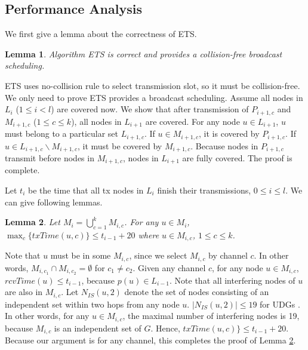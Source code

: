 \documentclass[10pt, conference]{IEEEtran}
\newtheorem{lemma}{Lemma}
\begin{document}
\subsection{Performance Analysis}
We first give a lemma about the correctness of ETS.
\begin{lemma} \label{correctness}
Algorithm ETS is correct and provides a collision-free broadcast scheduling.
\end{lemma}
\begin{IEEEproof}
ETS uses no-collision rule to select transmission slot, so it
must be collision-free. We only need to prove ETS provides a
broadcast scheduling. Assume all nodes in $L_{i}$ ($1 \leq i
<l$) are covered now. We show that after transmission of
$P_{i+1,c}$ and $M_{i+1,c}$ ($1 \leq c \leq k$), all nodes in
$L_{i+1}$ are covered. For any node $u \in L_{i+1}$, $u$ must
belong to a particular set $L_{i+1,c}$. If $u \in M_{i+1,c}$,
it is covered by $P_{i+1,c}$. If $u \in L_{i+1,c}\backslash
M_{i+1,c}$, it must be covered by $M_{i+1,c}$. Because nodes in
$P_{i+1,c}$ transmit before nodes in $M_{i+1,c}$, nodes in
$L_{i+1}$ are fully covered. The proof is complete.

\end{IEEEproof}

Let $t_i$ be the time that all tx nodes in $L_i$ finish their
transmissions, $0 \leq i \leq l$. We can give following lemmas.
\begin{lemma} \label{dominators}
Let $M_i = \bigcup_{c=1}^{k} M_{i,c}$. For any $u \in M_{i}$, $\max_c \{txTime(u,c)\} \leq t_{i-1} +
20$ where $u \in M_{i,c}$, $1 \leq c \leq k$.
\end{lemma}
\begin{IEEEproof}
Note that $u$ must be in some $M_{i,c}$, since we select
$M_{i,c}$ by channel $c$. In other words, $M_{i,c_1} \cap
M_{i,c_2} = \emptyset$ for $c_1 \neq c_2$.
Given any channel $c$, for any node $u \in M_{i,c}$,
$rcvTime(u) \leq t_{i-1}$, because $p(u) \in L_{i-1}$.
Note that all interfering nodes of $u$ are also in
$M_{i,c}$. Let $N_{IS}(u,2)$ denote the set of nodes consisting of an independent set within two hops
from any node $u$. $|N_{IS}(u,2)| \leq 19$ for UDGs
\cite{info09}. In other words, for any $u \in M_{i,c}$, the maximal number of interfering
nodes is 19, because $M_{i,c}$ is an independent set of $G$.
Hence, $txTime(u,c)\} \leq t_{i-1} + 20$. Because our
argument is for any channel, this completes the proof of Lemma \ref{dominators}.
\end{IEEEproof}
\end{document}
